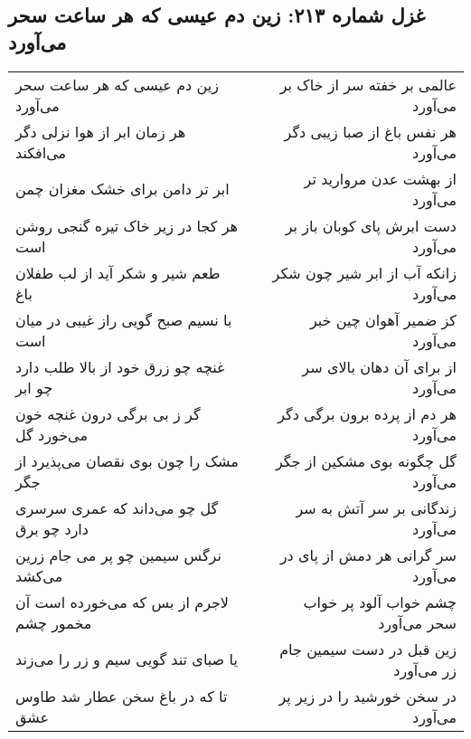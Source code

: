 \begin{center}
\section*{غزل شماره ۲۱۳: زین دم عیسی که هر ساعت سحر می‌آورد}
\label{sec:213}
\begin{longtable}{l p{0.5cm} r}
زین دم عیسی که هر ساعت سحر می‌آورد
&&
عالمی بر خفته سر از خاک بر می‌آورد
\\
هر زمان ابر از هوا نزلی دگر می‌افکند
&&
هر نفس باغ از صبا زیبی دگر می‌آورد
\\
ابر تر دامن برای خشک مغزان چمن
&&
از بهشت عدن مروارید تر می‌آورد
\\
هر کجا در زیر خاک تیره گنجی روشن است
&&
دست ابرش پای کوبان باز بر می‌آورد
\\
طعم شیر و شکر آید از لب طفلان باغ
&&
زانکه آب از ابر شیر چون شکر می‌آورد
\\
با نسیم صبح گویی راز غیبی در میان است
&&
کز ضمیر آهوان چین خبر می‌آورد
\\
غنچه چو زرق خود از بالا طلب دارد چو ابر
&&
از برای آن دهان بالای سر می‌آورد
\\
گر ز بی برگی درون غنچه خون می‌خورد گل
&&
هر دم از پرده برون برگی دگر می‌آورد
\\
مشک را چون بوی نقصان می‌پذیرد از جگر
&&
گل چگونه بوی مشکین از جگر می‌آورد
\\
گل چو می‌داند که عمری سرسری دارد چو برق
&&
زندگانی بر سر آتش به سر می‌آورد
\\
نرگس سیمین چو پر می جام زرین می‌کشد
&&
سر گرانی هر دمش از پای در می‌آورد
\\
لاجرم از بس که می‌خورده است آن مخمور چشم
&&
چشم خواب آلود پر خواب سحر می‌آورد
\\
یا صبای تند گویی سیم و زر را می‌زند
&&
زین قبل در دست سیمین جام زر می‌آورد
\\
تا که در باغ سخن عطار شد طاوس عشق
&&
در سخن خورشید را در زیر پر می‌آورد
\\
\end{longtable}
\end{center}
